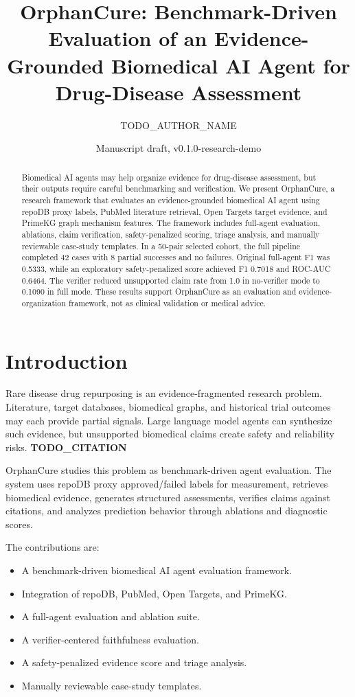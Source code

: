 \documentclass[11pt]{article}
\title{OrphanCure: Benchmark-Driven Evaluation of an Evidence-Grounded Biomedical AI Agent for Drug-Disease Assessment}
\author{TODO\_AUTHOR\_NAME}
\date{Manuscript draft, v0.1.0-research-demo}
\newcommand{\todoct}{\textbf{TODO\_CITATION}}
\begin{document}
\maketitle

\begin{abstract}
Biomedical AI agents may help organize evidence for drug-disease assessment, but their outputs require careful benchmarking and verification. We present OrphanCure, a research framework that evaluates an evidence-grounded biomedical AI agent using repoDB proxy labels, PubMed literature retrieval, Open Targets target evidence, and PrimeKG graph mechanism features. The framework includes full-agent evaluation, ablations, claim verification, safety-penalized scoring, triage analysis, and manually reviewable case-study templates. In a 50-pair selected cohort, the full pipeline completed 42 cases with 8 partial successes and no failures. Original full-agent F1 was 0.5333, while an exploratory safety-penalized score achieved F1 0.7018 and ROC-AUC 0.6464. The verifier reduced unsupported claim rate from 1.0 in no-verifier mode to 0.1090 in full mode. These results support OrphanCure as an evaluation and evidence-organization framework, not as clinical validation or medical advice.
\end{abstract}

\section{Introduction}
Rare disease drug repurposing is an evidence-fragmented research problem. Literature, target databases, biomedical graphs, and historical trial outcomes may each provide partial signals. Large language model agents can synthesize such evidence, but unsupported biomedical claims create safety and reliability risks. \todoct{}

OrphanCure studies this problem as benchmark-driven agent evaluation. The system uses repoDB proxy approved/failed labels for measurement, retrieves biomedical evidence, generates structured assessments, verifies claims against citations, and analyzes prediction behavior through ablations and diagnostic scores.

The contributions are:
\begin{itemize}
  \item A benchmark-driven biomedical AI agent evaluation framework.
  \item Integration of repoDB, PubMed, Open Targets, and PrimeKG.
  \item A full-agent evaluation and ablation suite.
  \item A verifier-centered faithfulness evaluation.
  \item A safety-penalized evidence score and triage analysis.
  \item Manually reviewable case-study templates.
\end{itemize}
\end{document}
